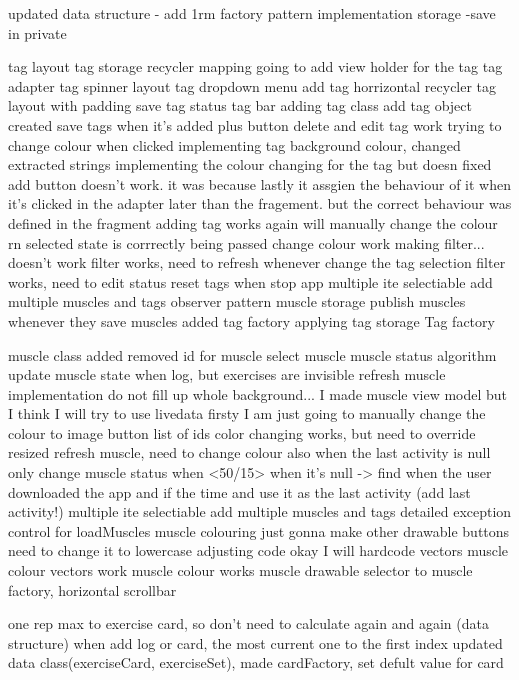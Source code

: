 

updated data structure - add 1rm
factory pattern implementation 
storage -save in private



tag layout
tag storage
recycler mapping
going to add view holder for the tag
tag adapter
tag spinner layout
tag dropdown menu
add tag
horrizontal recycler
tag layout with padding
save tag
status tag bar
adding tag class
add tag object created
save tags when it's added
plus button
delete and edit tag work
trying to change colour when clicked
implementing tag background colour, changed extracted strings
implementing the colour changing for the tag but doesn
fixed add button doesn't work. it was because lastly it assgien the behaviour of it when it's clicked in the adapter later than the fragement. but the correct behaviour was defined in the fragment
adding tag works again
will manually change the colour rn
selected state is corrrectly being passed
change colour work
making filter... doesn't work
filter works, need to refresh whenever change the tag selection
filter works, need to edit status
reset tags when stop app
multiple ite selectiable
add multiple muscles and tags
observer pattern
muscle storage publish muscles whenever they save muscles
added tag factory
applying tag storage
Tag factory


muscle class added
removed id for muscle
select muscle
muscle status algorithm
update muscle state when log, but exercises are invisible
refresh muscle implementation
do not fill up whole background...
I made muscle view model but I think I will try to use livedata firsty
I am just going to manually change the colour
to image button
list of ids
color changing works, but need to override
resized
refresh muscle, need to change colour also when the last activity is null
only change muscle status when <50/15>
when it's null -> find when the user downloaded the app and if the time and use it as the last activity (add last activity!)
multiple ite selectiable
add multiple muscles and tags
detailed exception control for loadMuscles
muscle colouring
just gonna make other drawable buttons
need to change it to lowercase
adjusting code
okay I will hardcode
vectors
muscle colour vectors
work
muscle colour works
muscle drawable selector to muscle factory, horizontal scrollbar


one rep max to exercise card, so don't need to calculate again and again (data structure)
when add log or card, the most current one to the first index
updated data class(exerciseCard, exerciseSet), made cardFactory, set defult value for card


